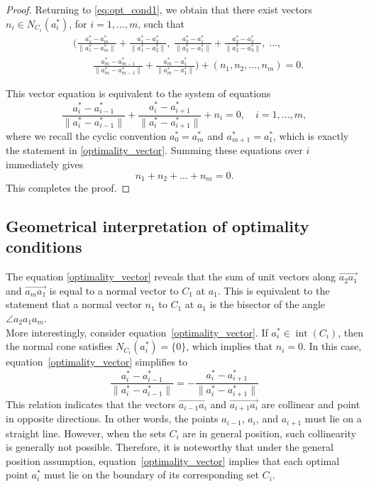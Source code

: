 \documentclass[12pt]{article}
\theoremstyle{plain}
\theoremstyle{definition}
\newtheorem{remark}[theorem]{Remark}
\begin{document}
\begin{proof}
	
	
	Returning to \eqref{eq:opt_cond1}, we obtain that there exist vectors $n_i\in N_{C_i}(a_i^*)$, for $i=1,\dots,m$, such that
	\begin{align*}
		&\Biggl(
		\frac{a_1^* - a_m^*}{\|a_1^* - a_m^*\|}
		+ \frac{a_1^* - a_2^*}{\|a_1^* - a_2^*\|},\;
		\frac{a_2^* - a_1^*}{\|a_2^* - a_1^*\|}
		+ \frac{a_2^* - a_3^*}{\|a_2^* - a_3^*\|},\; \dots, \\
		&\qquad \frac{a_m^* - a_{m-1}^*}{\|a_m^* - a_{m-1}^*\|}
		+ \frac{a_m^* - a_1^*}{\|a_m^* - a_1^*\|}
		\Biggr)
		+ (n_1, n_2, \dots, n_m) = 0.
	\end{align*}
	
	
	
	
	This vector equation is equivalent to the system of equations
	\[
	\frac{a_i^*-a_{i-1}^*}{\|a_i^*-a_{i-1}^*\|}+\frac{a_i^*-a_{i+1}^*}{\|a_i^*-a_{i+1}^*\|}+ n_i =0,\quad i=1,\dots,m,
	\]
	where we recall the cyclic convention $a_0^*=a_m^*$ and $a_{m+1}^*=a_1^*$, which is exactly the statement in \eqref{optimality_vector}. Summing these equations over $i$ immediately gives
	$$ n_1+n_2+\dots+n_m=0. $$
	This completes the proof.
\end{proof}
\subsection{Geometrical interpretation of optimality conditions}
The equation \eqref{optimality_vector} reveals that the sum of unit vectors along $\overrightarrow{a_2a_1}$  and $\overrightarrow{a_ma_1}$ is equal to a normal vector to $C_1$ at $a_1$. This is equivalent to the statement that a normal vector $n_1$ to $C_1$ at $a_1$ is the bisector of the angle $\angle a_2a_1a_m.$\\

More interestingly, consider equation~\eqref{optimality_vector}. If $a_i^* \in \operatorname{int}(C_i)$, then the normal cone satisfies $N_{C_i}(a_i^*) = \{0\}$, which implies that $n_i = 0$. In this case, equation~\eqref{optimality_vector} simplifies to
\begin{equation}
	\frac{a_i^* - a_{i-1}^*}{\|a_i^* - a_{i-1}^*\|} = - \frac{a_i^* - a_{i+1}^*}{\|a_i^* - a_{i+1}^*\|}
\end{equation}
This relation indicates that the vectors $\overrightarrow{a_{i-1}a_i}$ and $\overrightarrow{a_{i+1}a_i}$ are collinear and point in opposite directions. In other words, the points $a_{i-1}$, $a_i$, and $a_{i+1}$ must lie on a straight line. However, when the sets $C_i$ are in general position, such collinearity is generally not possible. Therefore, it is noteworthy that under the general position assumption, equation~\eqref{optimality_vector} implies that each optimal point $a_i^*$ must lie on the boundary of its corresponding set $C_i$.
\end{document}
